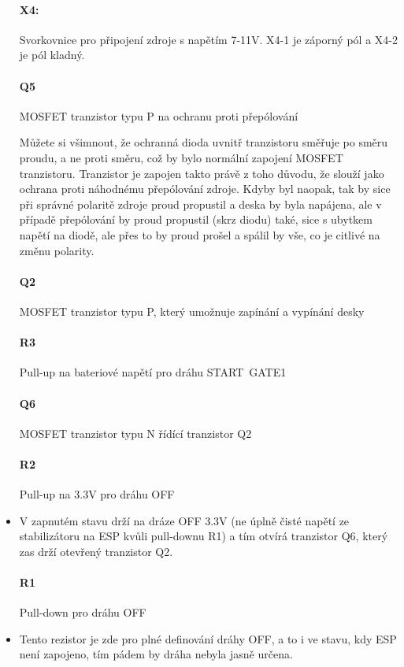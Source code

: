 \documentclass{template/socthesis}
\begin{document}
\begin{itemize}
	\paragraph*{X4:}
	Svorkovnice pro připojení zdroje s napětím 7-11V. X4-1 je záporný pól a X4-2 je pól kladný.
	\paragraph*{Q5}
	MOSFET tranzistor typu P na ochranu proti přepólování
	
	Můžete si všimnout, že ochranná dioda uvnitř tranzistoru směřuje po směru proudu, a ne proti směru, což by bylo normální zapojení MOSFET tranzistoru.
	Tranzistor je zapojen takto právě z toho důvodu, že slouží jako ochrana proti náhodnému přepólování zdroje. Kdyby byl naopak, tak by sice při správné polaritě zdroje proud propustil a deska by byla napájena, ale v případě přepólování by proud propustil (skrz diodu) také, sice s ubytkem napětí na diodě, ale přes to by proud prošel a spálil by vše, co je citlivé na změnu polarity.
	\paragraph*{Q2}
	MOSFET tranzistor typu P, který umožnuje zapínání a vypínání desky
	\paragraph*{R3}
	Pull-up na bateriové napětí pro dráhu START~GATE1
	\paragraph*{Q6}
	MOSFET tranzistor typu N řídící tranzistor Q2
	\paragraph{R2}
	Pull-up na 3.3V pro dráhu OFF
	\item V zapnutém stavu drží na dráze OFF 3.3V
	(ne úplně čisté napětí ze stabilizátoru na ESP kvůli pull-downu R1) a tím otvírá tranzistor Q6, který zas drží otevřený tranzistor Q2.
	
	\paragraph*{R1}
	Pull-down pro dráhu OFF
	\item Tento rezistor je zde pro plné definování dráhy OFF,
	a to i ve stavu, kdy ESP není zapojeno, tím pádem by dráha nebyla jasně určena.
	

\end{itemize}
\end{document}
